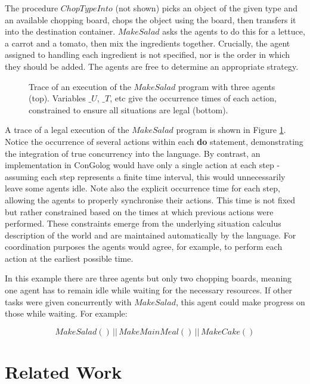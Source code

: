 \documentclass[letterpaper]{article}
\begin{document}
The procedure $ChopTypeInto$ (not shown) picks an object of the given
type and an available chopping board, chops the object using the board,
then transfers it into the destination container. $MakeSalad$ asks
the agents to do this for a lettuce, a carrot and a tomato, then mix
the ingredients together. Crucially, the agent assigned to handling
each ingredient is not specified, nor is the order in which they should
be added. The agents are free to determine an appropriate strategy.

%
\begin{figure}[hbt]





\caption{\label{cap:example_trace}Trace of an execution of the $MakeSalad$
program with three agents (top). Variables $\_ U$, $\_ T$, etc give
the occurrence times of each action, constrained to ensure all situations
are legal (bottom).}
\end{figure}


A trace of a legal execution of the $MakeSalad$ program is shown
in Figure \ref{cap:example_trace}. Notice the occurrence of several
actions within each \textbf{do} statement, demonstrating the integration
of true concurrency into the language. By contrast, an implementation
in ConGolog would have only a single action at each step - assuming
each step represents a finite time interval, this would unnecessarily
leave some agents idle. Note also the explicit occurrence time for
each step, allowing the agents to properly synchronise their actions.
This time is not fixed but rather constrained based on the times at
which previous actions were performed. These constraints emerge from
the underlying situation calculus description of the world and are
maintained automatically by the language. For coordination purposes
the agents would agree, for example, to perform each action at the
earliest possible time.

In this example there are three agents but only two chopping boards,
meaning one agent has to remain idle while waiting for the necessary
resources. If other tasks were given concurrently with $MakeSalad$,
this agent could make progress on those while waiting. For example:

\[
MakeSalad()\,||\, MakeMainMeal()\,||\, MakeCake()\]


\section{Related Work}
\end{document}
